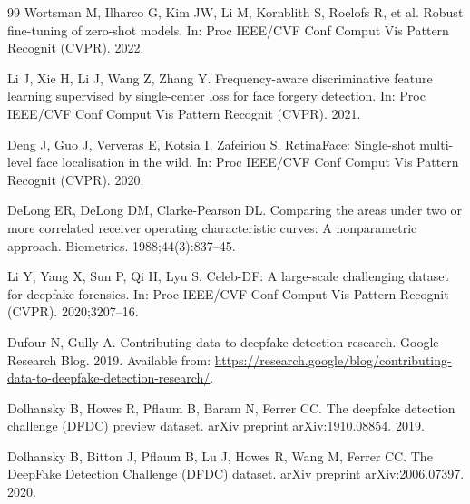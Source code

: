 \documentclass[fonts]{icst}
\begin{document}
\begin{thebibliography}{99}
Wortsman M, Ilharco G, Kim JW, Li M, Kornblith S, Roelofs R, et al.
Robust fine-tuning of zero-shot models.
In: Proc IEEE/CVF Conf Comput Vis Pattern Recognit (CVPR). 2022.

Li J, Xie H, Li J, Wang Z, Zhang Y.
Frequency-aware discriminative feature learning supervised by single-center loss for face forgery detection.
In: Proc IEEE/CVF Conf Comput Vis Pattern Recognit (CVPR). 2021.

Deng J, Guo J, Ververas E, Kotsia I, Zafeiriou S.
RetinaFace: Single-shot multi-level face localisation in the wild.
In: Proc IEEE/CVF Conf Comput Vis Pattern Recognit (CVPR). 2020.

DeLong ER, DeLong DM, Clarke-Pearson DL.
Comparing the areas under two or more correlated receiver operating characteristic curves: A nonparametric approach.
Biometrics. 1988;44(3):837--45.

Li Y, Yang X, Sun P, Qi H, Lyu S.
Celeb-DF: A large-scale challenging dataset for deepfake forensics.
In: Proc IEEE/CVF Conf Comput Vis Pattern Recognit (CVPR). 2020;3207--16.

Dufour N, Gully A.
Contributing data to deepfake detection research.
Google Research Blog. 2019. Available from: \url{https://research.google/blog/contributing-data-to-deepfake-detection-research/}.

Dolhansky B, Howes R, Pflaum B, Baram N, Ferrer CC.
The deepfake detection challenge (DFDC) preview dataset.
arXiv preprint arXiv:1910.08854. 2019.

Dolhansky B, Bitton J, Pflaum B, Lu J, Howes R, Wang M, Ferrer CC.
The DeepFake Detection Challenge (DFDC) dataset.
arXiv preprint arXiv:2006.07397. 2020.

\end{thebibliography}
\end{document}
